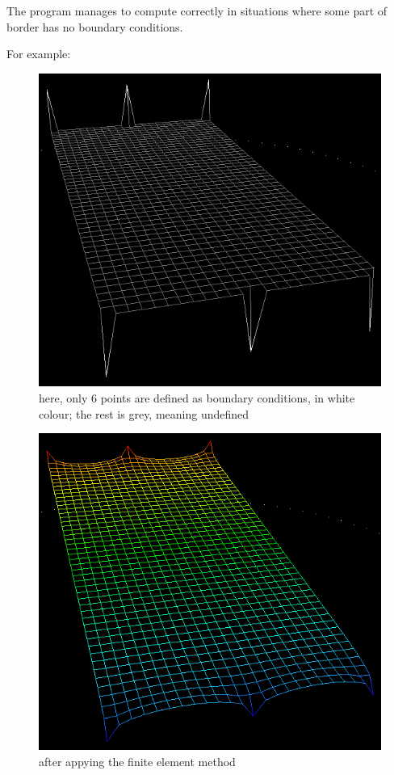 \documentclass[a4paper,12pt]{article}
\begin{document}
The program manages to compute correctly in situations where some part of border has no boundary conditions.

For example:

\begin{figure}[H]
\begin{center}
  \includegraphics[width=\textwidth]{six_points}
\end{center}
\caption{here, only 6 points are defined as boundary conditions, in white colour; the rest is grey, meaning undefined}
\end{figure}

\begin{figure}[H]
\begin{center}
  \includegraphics[width=\textwidth]{six_points_smooth}
\end{center}
\caption{after appying the finite element method}
\end{figure}
\end{document}
